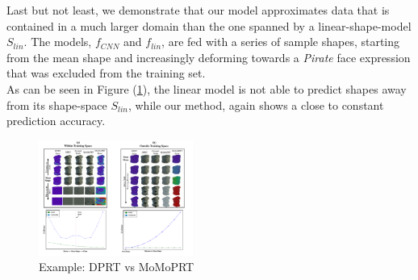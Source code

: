 Last but not least, we demonstrate that our model approximates data that is contained in a much larger domain than the one spanned by a linear-shape-model $S_{lin}$. The models, $f_{CNN}$ and $f_{lin}$, are fed with a series of sample shapes, starting from the mean shape and increasingly deforming towards a \textit{Pirate} face expression that was excluded from the training set. \\
As can be seen in Figure (\ref{Fig:DPRT vs MoMoPRT B}), the linear model is not able to predict shapes away from its shape-space $S_{lin}$, while our method, again shows a close to constant prediction accuracy.
\begin{figure}[H]
  \centering
    \includegraphics[width=0.45\textwidth]{Figures/DPRT_vs_MoMoPRT_b.pdf}
     \caption{Example: DPRT vs MoMoPRT}
     \label{Fig:DPRT vs MoMoPRT B}
\end{figure}

